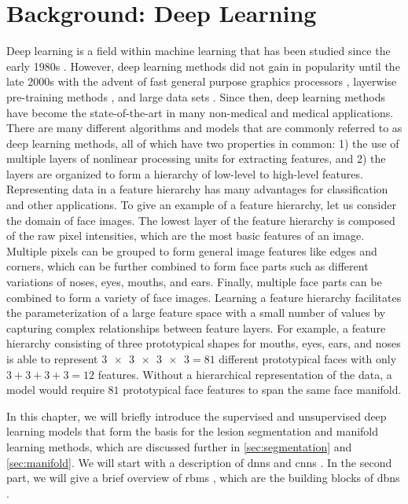 \chapter{Background: Deep Learning}
\label{sec:background}

Deep learning is a field within machine learning that has been studied since the
early 1980s \citep{fukushima1980}. However, deep learning methods did not gain
in popularity until the late 2000s with the advent of fast general purpose
graphics processors \citep{raina2009}, layerwise pre-training methods
\citep{hinton2006b,hinton2006c}, and large data sets
\citep{deng2009,krizhevsky2012}. Since then, deep learning methods have become
the state-of-the-art in many non-medical \citep{krizhevsky2012,sainath2013} and
medical \citep{ciresan2012,kamnitsas2015} applications. There are many different
algorithms and models that are commonly referred to as deep learning methods,
all of which have two properties in common: 1) the use of multiple layers of
nonlinear processing units for extracting features, and 2) the layers are
organized to form a hierarchy of low-level to high-level features. Representing
data in a feature hierarchy has many advantages for classification and other
applications. To give an example of a feature hierarchy, let us consider the
domain of face images. The lowest layer of the feature hierarchy is composed of
the raw pixel intensities, which are the most basic features of an image.
Multiple pixels can be grouped to form general image features like edges and
corners, which can be further combined to form face parts such as different
variations of noses, eyes, mouths, and ears.
Finally, multiple face parts can be combined to form a variety of face images.
Learning a feature hierarchy facilitates the parameterization of a large feature
space with a small number of values by capturing complex relationships between
feature layers. For example, a feature hierarchy consisting of three
prototypical shapes for mouths, eyes, ears, and noses is able to represent
$\num{3x3x3x3} = 81$ different prototypical faces with only $3+3+3+3=12$
features. Without a hierarchical representation of the data, a model would
require $81$ prototypical face features to span the same face manifold.

In this chapter, we will briefly introduce the supervised and unsupervised deep
learning models that form the basis for the lesion segmentation and manifold
learning methods, which are discussed further in \ref{sec:segmentation} and
\ref{sec:manifold}. We will start with a description of \glspl{dnn}
\citep{farley1954,werbos1974,rumelhart1986} and \glspl{cnn}
\citep{fukushima1980,lecun1989,lecun1998}. In the second part, we will give a
brief overview of \glspl{rbm} \citep{freund1992,hinton2010a}, which are the
building blocks of \glspl{dbn} \citep{hinton2006b}.

